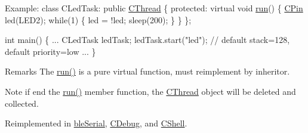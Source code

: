 \begin{DoxyCode}
Example:
        \textcolor{keyword}{class }CLedTask: \textcolor{keyword}{public} \hyperlink{class_c_thread}{CThread} \{
        \textcolor{keyword}{protected}:
            \textcolor{keyword}{virtual} \textcolor{keywordtype}{void} \hyperlink{class_c_thread_a071c3d3b3c19a7bd6a01aca073a9b4d7}{run}() \{
                \hyperlink{class_c_pin}{CPin} led(LED2);
                \textcolor{keywordflow}{while}(1) \{
                    led = !led;
                    sleep(200);
                \}
            \}
        \};

        \textcolor{keywordtype}{int} main() \{
            ...
            CLedTask ledTask;
            ledTask.start(\textcolor{stringliteral}{"led"});   \textcolor{comment}{// default stack=128, default priority=low}
            ...
        \}
\end{DoxyCode}
 \begin{DoxyRemark}{Remarks}
The \hyperlink{class_c_thread_a071c3d3b3c19a7bd6a01aca073a9b4d7}{run()} is a pure virtual function, must reimplement by inheritor. 
\end{DoxyRemark}
\begin{DoxyNote}{Note}
if end the \hyperlink{class_c_thread_a071c3d3b3c19a7bd6a01aca073a9b4d7}{run()} member function, the \hyperlink{class_c_thread}{C\-Thread} object will be deleted and collected. 
\end{DoxyNote}


Reimplemented in \hyperlink{classble_serial_a4dafdc7b9fd47f760707156e8937f74e}{ble\-Serial}, \hyperlink{class_c_debug_a9a3e40cc8ee5d0c2a41577f658779c71}{C\-Debug}, and \hyperlink{class_c_shell_a1565a93fad9a1e35e05a597889ad130f}{C\-Shell}.

